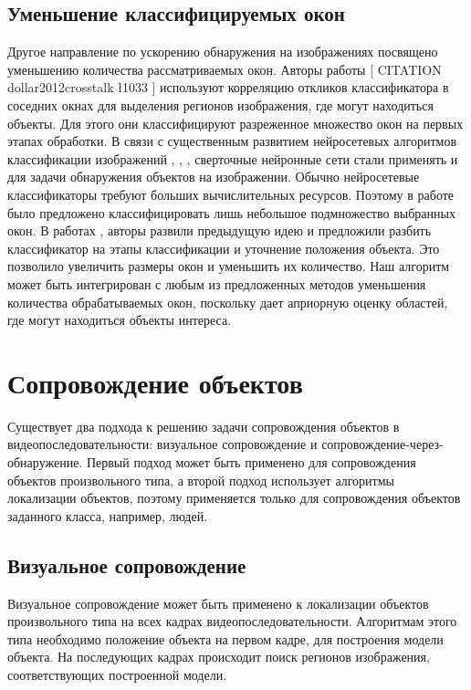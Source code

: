 \subsection{Уменьшение классифицируемых окон}

Другое направление по ускорению обнаружения на изображениях посвящено уменьшению количества рассматриваемых окон. Авторы работы [ CITATION dollar2012crosstalk \l 1033 ] используют корреляцию откликов классификатора в соседних окнах для выделения регионов изображения, где могут находиться объекты. Для этого они классифицируют разреженное множество окон на первых этапах обработки. В связи с существенным развитием нейросетевых алгоритмов классификации изображений \cite{krizhevsky2012imagenet}, \cite{simonyan2014very}, \cite{he2015deep}, \cite{szegedy2015rethinking} сверточные нейронные сети стали применять и для задачи обнаружения объектов на изображении. Обычно нейросетевые классификаторы требуют больших вычислительных ресурсов. Поэтому в работе \cite{girshick2014rich} было предложено классифицировать лишь небольшое подмножество выбранных окон. В работах \cite{girshick2015fast}, \cite{ren2015faster} авторы развили предыдущую идею и предложили разбить классификатор на этапы классификации и уточнение положения объекта. Это позволило увеличить размеры окон и уменьшить их количество. Наш алгоритм может быть интегрирован с любым из предложенных методов уменьшения количества обрабатываемых окон, поскольку дает априорную оценку областей, где могут находиться объекты интереса.

\section{Сопровождение объектов}

Существует два подхода к решению задачи сопровождения объектов в видеопоследовательности: визуальное сопровождение и сопровождение-через-обнаружение. Первый подход может быть применено для сопровождения объектов произвольного типа, а второй подход использует алгоритмы локализации объектов, поэтому применяется только для сопровождения объектов заданного класса, например, людей.

\subsection{Визуальное сопровождение}

Визуальное сопровождение может быть применено к локализации объектов произвольного типа на всех кадрах видеопоследовательности. Алгоритмам этого типа необходимо положение объекта на первом кадре, для построения модели объекта. На последующих кадрах происходит поиск регионов изображения, соответствующих построенной модели.

